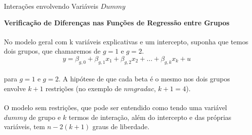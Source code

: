 \documentclass[t,14pt,mathserif]{beamer}
\begin{document}
{
\begin{frame}{Interações envolvendo Variáveis $Dummy$}
		\begin{tcolorbox}
			\indent\textbf{\small{Verificação de Diferenças nas Funções de Regressão entre Grupos}}\\ 
			\\ \footnotesize{No modelo geral com k variáveis explicativas e um intercepto, suponha que temos dois grupos, que chamaremos de $g = 1$ e $g = 2$.}\\
		    \begin{equation}
			y = \beta_{g,0} + \beta_{g,1}x_1 + \beta_{g,2}x_2 + ... + \beta_{g,k}x_k + u \label{eq1}\nonumber
			\end{equation}
			 \\ \footnotesize{para $g = 1$ e $g = 2$. A hipótese de que cada beta é o mesmo nos dois grupos envolve $k + 1$ restrições (no exemplo de $nmgradac$, $k + 1 = 4$)}.\\
			 \\ \footnotesize{O modelo sem restrições, que pode ser entendido como tendo uma variável $dummy$ de grupo e $k$ termos de interação, além do intercepto e das próprias variáveis, tem $n - 2(k + 1)$ graus de liberdade}.
		\end{tcolorbox}
       
\end{frame}
}  
\end{document}
